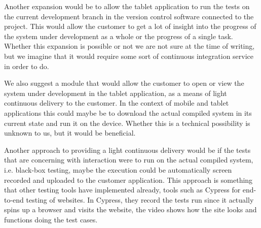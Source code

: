 Another expansion would be to allow the tablet application to run the tests on the current development branch in the version control software connected to the project.
This would allow the customer to get a lot of insight into the progress of the system under development as a whole or the progress of a single task.
Whether this expansion is possible or not we are not sure at the time of writing, but we imagine that it would require some sort of continuous integration service in order to do.

We also suggest a module that would allow the customer to open or view the system under development in the tablet application, as a means of light continuous delivery to the customer.
In the context of mobile and tablet applications this could maybe be to download the actual compiled system in its current state and run it on the device. 
Whether this is a technical possibility is unknown to us, but it would be beneficial.

Another approach to providing a light continuous delivery would be if the tests that are concerning with interaction were to run on the actual compiled system, i.e. black-box testing, maybe the execution could be automatically screen recorded and uploaded to the customer application.
This approach is something that other testing tools have implemented already, tools such as Cypress for end-to-end testing of websites.
In Cypress, they record the tests run since it actually spins up a browser and visits the website, the video shows how the site looks and functions doing the test cases.